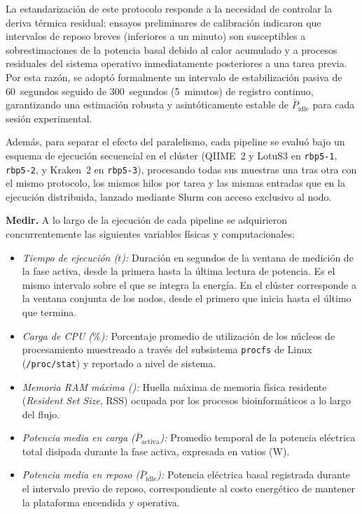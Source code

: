 \documentclass[12pt,oneside,spanish]{book}
\begin{document}
    La estandarización de este protocolo responde a la necesidad de controlar la deriva térmica residual: ensayos preliminares de calibración indicaron que intervalos de reposo breves (inferiores a un minuto) son susceptibles a sobrestimaciones de la potencia basal debido al calor acumulado y a procesos residuales del sistema operativo inmediatamente posteriores a una tarea previa. Por esta razón, se adoptó formalmente un intervalo de estabilización pasiva de 60~segundos seguido de 300~segundos (5~minutos) de registro continuo, garantizando una estimación robusta y asintóticamente estable de $\bar{P}_{\text{idle}}$ para cada sesión experimental.
    
    Además, para separar el efecto del paralelismo, cada pipeline se evaluó bajo un esquema de ejecución secuencial en el clúster (QIIME~2 y LotuS3 en \texttt{rbp5-1}, \texttt{rbp5-2}, y Kraken~2 en \texttt{rbp5-3}), procesando todas sus muestras una tras otra con el mismo protocolo, los mismos hilos por tarea y las mismas entradas que en la ejecución distribuida, lanzado mediante Slurm con acceso exclusivo al nodo.
    
    \textbf{Medir.} A lo largo de la ejecución de cada pipeline se adquirieron concurrentemente las siguientes variables físicas y computacionales:
    \begin{itemize}
        \item \textit{Tiempo de ejecución ($t$):} Duración en segundos de la ventana de medición de la fase activa, desde la primera hasta la última lectura de potencia. Es el mismo intervalo sobre el que se integra la energía. En el clúster corresponde a la ventana conjunta de los nodos, desde el primero que inicia hasta el último que termina.
        \item \textit{Carga de CPU ($\%$):} Porcentaje promedio de utilización de los núcleos de procesamiento muestreado a través del subsistema \texttt{procfs} de Linux (\texttt{/proc/stat}) y reportado a nivel de sistema.
        \item \textit{Memoria RAM máxima ():} Huella máxima de memoria física residente (\textit{Resident Set Size}, RSS) ocupada por los procesos bioinformáticos a lo largo del flujo.
        \item \textit{Potencia media en carga ($\bar{P}_{\text{activa}}$):} Promedio temporal de la potencia eléctrica total disipada durante la fase activa, expresada en vatios (W).
        \item \textit{Potencia media en reposo ($\bar{P}_{\text{idle}}$):} Potencia eléctrica basal registrada durante el intervalo previo de reposo, correspondiente al costo energético de mantener la plataforma encendida y operativa.
    \end{itemize}
    
\end{document}
